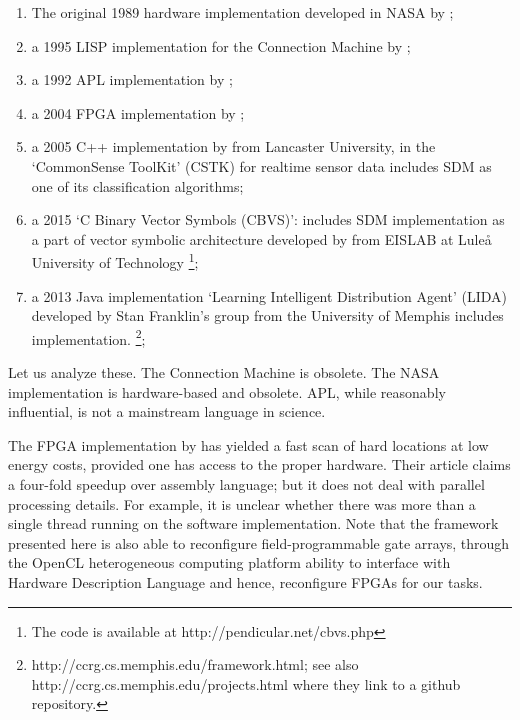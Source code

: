 \documentclass[preprint,12pt, a4paper]{elsarticle}
\begin{document}
\begin{enumerate}
    \item The original 1989 hardware implementation developed in NASA by \citet{flynn_sparse_1989};

    \item a 1995 LISP implementation for the Connection Machine by \citet{turk_kanervas_1995};

    \item a 1992 APL implementation by \citet{surkan_wsdm:_1992};

    \item a 2004 FPGA implementation by \citet{silva_reconfigurable_2004};

    \item a 2005 C++ implementation by \citet{berchtold_processing_2005} from Lancaster University, in the `CommonSense ToolKit' (CSTK) \citep{noauthor_cstk:_nodate} for realtime sensor data includes SDM as one of its classification algorithms;

    \item  a 2015 `C Binary Vector Symbols (CBVS)':  includes SDM implementation as a part of  vector symbolic architecture developed by \citet{emruli_vector_2015} from EISLAB at Luleå University of Technology \footnote{The code is available at http://pendicular.net/cbvs.php};

    \item a 2013 Java implementation `Learning Intelligent Distribution Agent' (LIDA) developed by \citep{franklin_lida:_2014, snaider_integer_2013, snaider_modular_2014} Stan Franklin's group from the University of Memphis includes implementation. \footnote{http://ccrg.cs.memphis.edu/framework.html; see also http://ccrg.cs.memphis.edu/projects.html where they link to a github repository.};

\end{enumerate}

Let us analyze these.  The Connection Machine is obsolete.  The NASA implementation is hardware-based and obsolete.  APL, while reasonably influential, is not a mainstream language in science.

The FPGA implementation by \citet{silva_reconfigurable_2004} has yielded a fast scan of hard locations at low energy costs, provided one has access to the proper hardware. Their article claims a four-fold speedup over assembly language; but it does not deal with parallel processing details.  For example, it is unclear whether there was more than a single thread running on the software implementation.  Note that the framework presented here is also able to reconfigure field-programmable gate arrays, through the OpenCL heterogeneous computing platform ability to interface with Hardware Description Language and hence, reconfigure FPGAs \citep{waidyasooriya2018design, czajkowski_opencl_2012} for our tasks.
\end{document}
